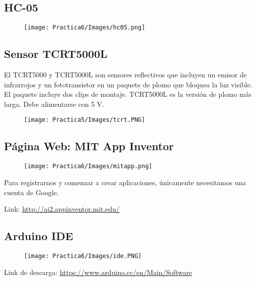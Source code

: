 \documentclass[12pt]{article}
\begin{document}
    \subsection{HC-05}
        \begin{figure}[h!]
                \centering
                \texttt{[image: Practica6/Images/hc05.png]}
            \end{figure} 
            
    
    \subsection{Sensor TCRT5000L}

    
    El TCRT5000 y TCRT5000L son sensores reflectivos que incluyen un emisor de infrarrojos y un fototransistor en un paquete de plomo que bloquea la luz visible. El paquete incluye dos clips de montaje. TCRT5000L es la versión de plomo más larga. Debe alimentarse con 5 V.
    
    \begin{figure}[h!]
                \centering
                \texttt{[image: Practica5/Images/tcrt.PNG]}
            \end{figure} 
            
    \subsection{Página Web: MIT App Inventor}
        \begin{figure}[h!]
                \centering
                \texttt{[image: Practica6/Images/mitapp.png]}
            \end{figure} 
            
        Para registrarnos y comenzar a crear aplicaciones, únicamente necesitamos una cuenta de Google.
        
        Link: \textcolor{blue}{\url{http://ai2.appinventor.mit.edu/}}
        
    \subsection{Arduino IDE}
        \begin{figure}[h!]
                \centering
                \texttt{[image: Practica6/Images/ide.PNG]}
            \end{figure} 
            
        
        Link de descarga: \textcolor{blue}{\url{https://www.arduino.cc/en/Main/Software}}
    
       


    \nocite{ref1, ref2, ref3, ref4, ref5}
    
        

    
\end{document}
